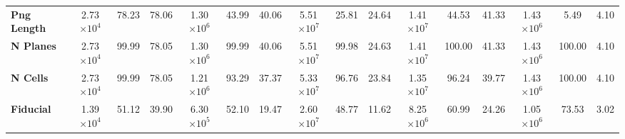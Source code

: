 \begin{landscape}
\begin{table}[!hb]
\begin{tabular}{|l|ccc|ccc|ccc|ccc|ccc|}
\textbf{Png Length} & 2.73$\times 10^4$           & 78.23                                                               & 78.06                                      & 1.30$\times 10^6$             & 43.99                                                                 & 40.06                                        & 5.51$\times 10^7$          & 25.81                                                                  & 24.64                                         & 1.41$\times 10^7$                   & 44.53                                                              & 41.33                                     & 1.43$\times 10^6$             & 5.49                                                                  & 4.10                                         \\
\textbf{N Planes}       & 2.73$\times 10^4$           & 99.99                                                               & 78.05                                      & 1.30$\times 10^6$             & 99.99                                                                 & 40.06                                        & 5.51$\times 10^7$          & 99.98                                                                  & 24.63                                         & 1.41$\times 10^7$                   & 100.00                                                             & 41.33                                     & 1.43$\times 10^6$             & 100.00                                                                & 4.10                                         \\
\textbf{N Cells}        & 2.73$\times 10^4$           & 99.99                                                               & 78.05                                      & 1.21$\times 10^6$             & 93.29                                                                 & 37.37                                        & 5.33$\times 10^7$          & 96.76                                                                  & 23.84                                         & 1.35$\times 10^7$                   & 96.24                                                              & 39.77                                     & 1.43$\times 10^6$             & 100.00                                                                & 4.10                                         \\
\textbf{Fiducial}     & 1.39$\times 10^4$           & 51.12                                                               & 39.90                                      & 6.30$\times 10^5$ & 52.10                                                                 & 19.47                                        & 2.60$\times 10^7$          & 48.77                                                                  & 11.62                                         & 8.25$\times 10^6$          & 60.99                                                              & 24.26                                     & 1.05$\times 10^6$             & 73.53                                                                 & 3.02                                         \\

\end{tabular}
\end{table}
\end{landscape}

